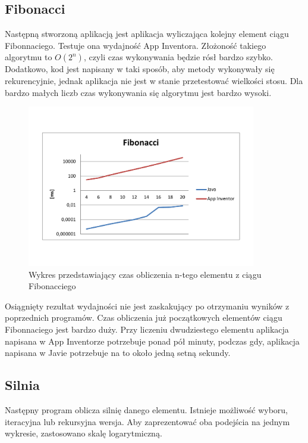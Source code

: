 \subsection{Fibonacci}

Następną stworzoną aplikacją jest aplikacja wyliczająca kolejny element ciągu Fibonnaciego. Testuje ona wydajność App Inventora. Złożoność takiego algorytmu to $O(2^n)$, czyli czas wykonywania będzie rósł bardzo szybko. Dodatkowo, kod jest napisany w taki sposób, aby metody wykonywały się rekurencyjnie, jednak aplikacja nie jest w stanie przetestować wielkości stosu. Dla bardzo małych liczb czas wykonywania się algorytmu jest bardzo wysoki.

\begin{figure}[H]
\centering\includegraphics[width=10cm]{figures/apps/fibonacciChart}
\caption{Wykres przedstawiający czas obliczenia n-tego elementu z ciągu Fibonacciego}
\end{figure}

Osiągnięty rezultat wydajności nie jest zaskakujący po otrzymaniu wyników z poprzednich programów. Czas obliczenia już początkowych elementów ciągu Fibonnaciego jest bardzo duży. Przy liczeniu dwudziestego elementu aplikacja napisana w App Inventorze potrzebuje ponad pół minuty, podczas gdy, aplikacja napisana w Javie potrzebuje na to około jedną setną sekundy.


\subsection{Silnia}

Następny program oblicza silnię danego elementu. Istnieje możliwość wyboru, iteracyjna lub rekursyjna wersja. Aby zaprezentować oba podejścia na jednym wykresie, zastosowano skalę logarytmiczną.

